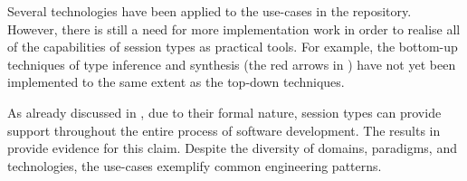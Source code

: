 
Several %
technologies have been applied to the use-cases in the repository. However, there is still a need for more implementation work in order to realise all of the capabilities of session types as practical tools. For example, the bottom-up techniques of type inference and synthesis (the red arrows in ) have not yet been implemented to the same extent as the top-down techniques.



%	
%	



As already discussed in ,
due to their formal
nature,
session types can provide support throughout the
entire process of software development.
The results in  provide evidence for this claim.
%
Despite the diversity of domains, paradigms,
and technologies, the use-cases exemplify common engineering patterns.

